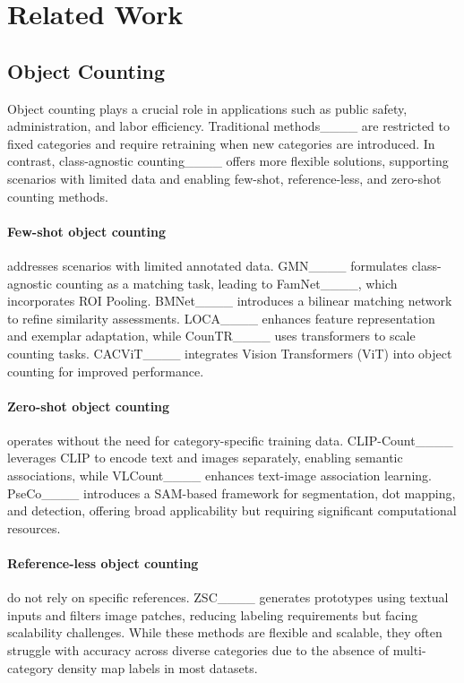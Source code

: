 \section{Related Work}
\subsection{Object Counting}
Object counting plays a crucial role in applications such as public safety, administration, and labor efficiency. Traditional methods____ are restricted to fixed categories and require retraining when new categories are introduced. In contrast, class-agnostic counting____ offers more flexible solutions, supporting scenarios with limited data and enabling few-shot, reference-less, and zero-shot counting methods.

\vspace{-10pt}
\paragraph{Few-shot object counting} addresses scenarios with limited annotated data. GMN____ formulates class-agnostic counting as a matching task, leading to FamNet____, which incorporates ROI Pooling. BMNet____ introduces a bilinear matching network to refine similarity assessments. LOCA____ enhances feature representation and exemplar adaptation, while CounTR____ uses transformers to scale counting tasks. CACViT____ integrates Vision Transformers (ViT) into object counting for improved performance.

\vspace{-10pt}
\paragraph{Zero-shot object counting} operates without the need for category-specific training data. CLIP-Count____ leverages CLIP to encode text and images separately, enabling semantic associations, while VLCount____ enhances text-image association learning. PseCo____ introduces a SAM-based framework for segmentation, dot mapping, and detection, offering broad applicability but requiring significant computational resources.

\vspace{-10pt}
\paragraph{Reference-less object counting} do not rely on specific references. ZSC____ generates prototypes using textual inputs and filters image patches, reducing labeling requirements but facing scalability challenges. While these methods are flexible and scalable, they often struggle with accuracy across diverse categories due to the absence of multi-category density map labels in most datasets.

